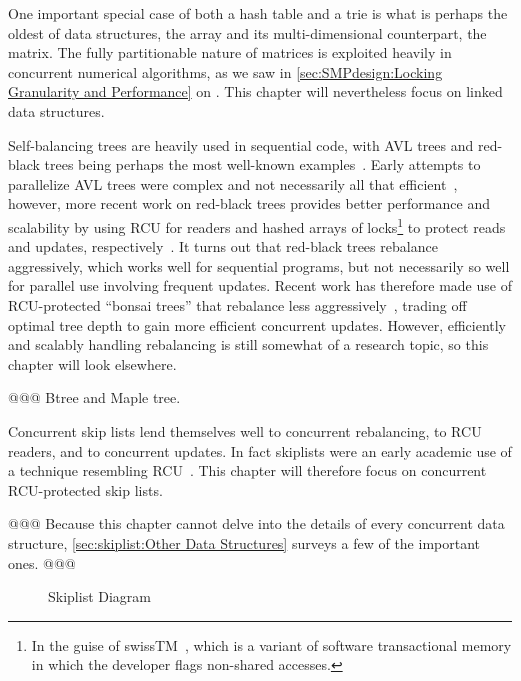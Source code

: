 One important special case of both a hash table and a trie is what is
perhaps the oldest of data structures, the array and its multi-dimensional
counterpart, the matrix.
The fully partitionable nature of matrices is exploited heavily in
concurrent numerical algorithms, as we saw in
\cref{sec:SMPdesign:Locking Granularity and Performance}
on
.
This chapter will nevertheless focus on linked data structures.

Self-balancing trees are heavily used in sequential code, with
AVL trees and red-black trees being perhaps the most well-known
examples~\cite{ThomasHCorman2001Algorithms}.
Early attempts to parallelize AVL trees were complex and not necessarily
all that efficient~\cite{Ellis80},
however, more recent work on red-black trees provides better
performance and scalability by using RCU for readers and hashed arrays
of locks\footnote{
	In the guise of swissTM~\cite{AleksandarDragovejic2011STMnotToy},
	which is a variant of software transactional memory in which
	the developer flags non-shared accesses.}
to protect reads and updates,
respectively~\cite{PhilHoward2011RCUTMRBTree,PhilipWHoward2013RCUrbtree}.
It turns out that red-black trees rebalance aggressively, which works
well for sequential programs, but not necessarily so well for parallel
use involving frequent updates.
Recent work has therefore made use of RCU-protected ``bonsai trees''
that rebalance less aggressively~\cite{AustinClements2012RCULinux:mmapsem},
trading off optimal tree depth to gain more efficient concurrent updates.
However, efficiently and scalably handling rebalancing is still somewhat
of a research topic, so this chapter will look elsewhere.

@@@ Btree and Maple tree.

Concurrent skip lists lend themselves well to concurrent rebalancing,
to RCU readers, and to concurrent updates.
In fact skiplists were an early academic use of a technique resembling
RCU~\cite{Pugh90}.
This chapter will therefore focus on concurrent RCU-protected skip lists.

@@@
Because this chapter cannot delve into the details of every concurrent
data structure,
\cref{sec:skiplist:Other Data Structures}
surveys a few of the important ones.
@@@

\begin{figure}
\centering
{}
\caption{Skiplist Diagram}
\label{fig:datastruct:Skiplist Diagram}
\end{figure}

